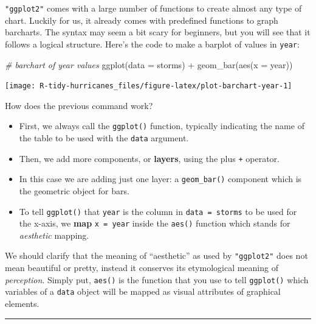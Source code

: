 \documentclass[
]{book}
\newenvironment{Shaded}{\begin{snugshade}}{\end{snugshade}}
\newcommand{\AttributeTok}[1]{\textcolor[rgb]{0.77,0.63,0.00}{#1}}
\newcommand{\CommentTok}[1]{\textcolor[rgb]{0.56,0.35,0.01}{\textit{#1}}}
\newcommand{\FunctionTok}[1]{\textcolor[rgb]{0.00,0.00,0.00}{#1}}
\newcommand{\NormalTok}[1]{#1}
\newcommand{\SpecialCharTok}[1]{\textcolor[rgb]{0.00,0.00,0.00}{#1}}
\begin{document}
\texttt{"ggplot2"} comes with a large number of functions to create almost any
type of chart. Luckily for us, it already comes with predefined
functions to graph barcharts. The syntax may seem a bit scary for beginners,
but you will see that it follows a logical structure. Here's the code to make
a barplot of values in \texttt{year}:

\begin{Shaded}
\begin{Highlighting}[]
\CommentTok{\# barchart of year values}
\FunctionTok{ggplot}\NormalTok{(}\AttributeTok{data =}\NormalTok{ storms) }\SpecialCharTok{+} 
  \FunctionTok{geom\_bar}\NormalTok{(}\FunctionTok{aes}\NormalTok{(}\AttributeTok{x =}\NormalTok{ year))}
\end{Highlighting}
\end{Shaded}

\begin{center}\texttt{[image: R-tidy-hurricanes\_files/figure-latex/plot-barchart-year-1]} \end{center}

How does the previous command work?

\begin{itemize}
\item
  First, we always call the \texttt{ggplot()} function, typically indicating the name
  of the table to be used with the \texttt{data} argument.
\item
  Then, we add more components, or \textbf{layers}, using the plus \texttt{+} operator.
\item
  In this case we are adding just one layer: a \texttt{geom\_bar()} component which is
  the geometric object for bars.
\item
  To tell \texttt{ggplot()} that \texttt{year} is the column in \texttt{data\ =\ storms} to be used for
  the x-axis, we \textbf{map} \texttt{x\ =\ year} inside the \texttt{aes()} function which stands for
  \emph{aesthetic} mapping.
\end{itemize}

We should clarify that the meaning of ``aesthetic'' as used by \texttt{"ggplot2"} does
not mean beautiful or pretty, instead it conserves its etymological
meaning of \emph{perception}. Simply put, \texttt{aes()} is the function that you use to
tell \texttt{ggplot()} which variables of a \texttt{data} object will be mapped as visual
attributes of graphical elements.

\begin{center}\rule{0.5\linewidth}{0.5pt}\end{center}
\end{document}

